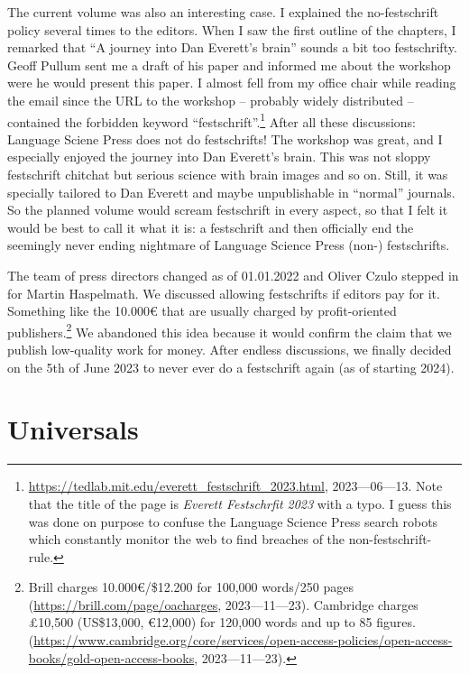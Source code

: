 \documentclass[output=paper,colorlinks,citecolor=brown]{langscibook}
\begin{document}
The current volume was also an interesting case. I explained the no-festschrift policy several
times to the editors. When I saw the first outline of the chapters, I remarked that ``A journey into Dan Everett's
brain'' sounds a bit too festschrifty. Geoff Pullum sent me a draft of his paper and informed me
about the workshop were he would present this paper. I almost fell from my office chair while
reading the email since the URL to the workshop -- probably widely distributed -- contained the forbidden keyword
``festschrift''.\footnote{
\url{https://tedlab.mit.edu/everett_festschrift_2023.html}, 2023—06—13. Note that the title of the
page is \emph{Everett Festschrfit 2023} with a typo. I guess this was done on purpose to confuse the
Language Science Press search robots which constantly monitor the web to find breaches of the
non-festschrift-rule.
} After all these discussions: Language Sciene Press does not do festschrifts! The
workshop was great, and I especially enjoyed the journey into Dan Everett's brain. This was not
sloppy festschrift chitchat but serious science with brain images and so on. Still, it was specially
tailored to Dan Everett and maybe unpublishable in ``normal'' journals. So the planned volume would
scream festschrift in every aspect, so that I felt it would be best to call it what it is: a festschrift
and then officially end the seemingly never ending nightmare of Language Science Press (non-) festschrifts. 

The team of press directors changed as of 01.01.2022 and Oliver Czulo stepped in for
Martin Haspelmath. We discussed allowing festschrifts if editors pay for it. Something like the
10.000€ that are usually charged by profit-oriented publishers.\footnote{
Brill charges 10.000€/\$12.200 for 100,000 words/250 pages (\url{https://brill.com/page/oacharges},
2023—11—23). Cambridge charges £10,500 (US\$13,000, €12,000) for 120,000 words and up to 85 figures.
(\url{https://www.cambridge.org/core/services/open-access-policies/open-access-books/gold-open-access-books}, 2023—11—23).
} 
 We abandoned this idea because it
would confirm the claim that we publish low-quality work for money. After endless discussions, we
finally decided on the 5th of June 2023 to never ever do a festschrift again (as of starting 2024). 






\section{Universals}
\end{document}
